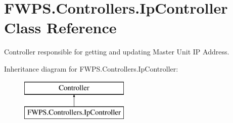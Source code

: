 \hypertarget{class_f_w_p_s_1_1_controllers_1_1_ip_controller}{}\section{F\+W\+P\+S.\+Controllers.\+Ip\+Controller Class Reference}
\label{class_f_w_p_s_1_1_controllers_1_1_ip_controller}


Controller responsible for getting and updating Master Unit IP Address.  


Inheritance diagram for F\+W\+P\+S.\+Controllers.\+Ip\+Controller\+:\begin{figure}[H]
\begin{center}
\leavevmode
\includegraphics[height=2.000000cm]{class_f_w_p_s_1_1_controllers_1_1_ip_controller}
\end{center}
\end{figure}
